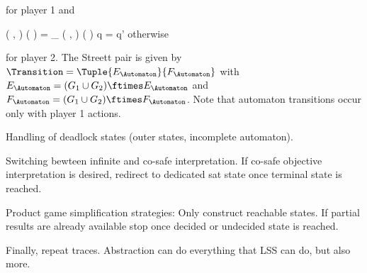 for player 1 and

\startformula
    \Transition
        \Big( ,  \Big)
        \Big(  \Big)
    = \startmathcases
        \NC \Transition_\GameGraph
        \Big( ,  \Big)
        \Big(  \Big)
        \MC \StartIf q = q'
        \NR
        \NC otherwise
        \NR
    \stopmathcases
\stopformula

for player 2.
The Streett pair is given by $\Transition = \Tuple{E_\Automaton}{F_\Automaton}$ with $E_\Automaton = (G_1 \cup G_2) \ftimes E_\Automaton$ and $F_\Automaton = (G_1 \cup G_2) \ftimes F_\Automaton$.
Note that automaton transitions occur only with player 1 actions.

Handling of deadlock states (outer states, incomplete automaton).

Switching bewteen infinite and co-safe interpretation.
If co-safe objective interpretation is desired, redirect to dedicated sat state once terminal state is reached.

Product game simplification strategies:
Only construct reachable states.
If partial results are already available stop once decided or undecided state is reached.

Finally, repeat traces.
Abstraction can do everything that LSS can do, but also more.

